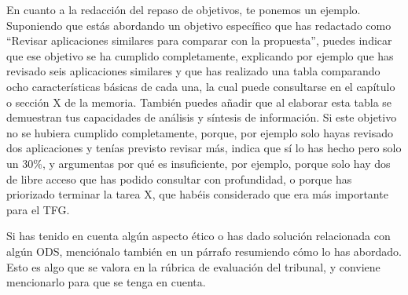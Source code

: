  En cuanto a la redacción del  repaso de objetivos, te ponemos un ejemplo. Suponiendo que estás abordando un objetivo específico que has redactado como ``Revisar aplicaciones similares para comparar con la propuesta'', puedes indicar que ese objetivo se ha cumplido completamente, explicando por ejemplo que has revisado seis aplicaciones similares y que has realizado una tabla comparando ocho características básicas de cada una, la cual puede consultarse en el capítulo o sección X de la memoria. También puedes añadir que al elaborar esta tabla se demuestran tus capacidades de análisis y síntesis de información. Si este objetivo no se hubiera cumplido completamente, porque, por ejemplo solo hayas revisado dos aplicaciones y tenías previsto revisar más, indica que sí lo has hecho pero solo un 30\%, y argumentas por qué es insuficiente, por ejemplo, porque solo hay dos de libre acceso que has podido consultar con profundidad, o porque has priorizado terminar la tarea X, que habéis considerado que era más importante para el TFG. 

 Si has tenido en cuenta algún aspecto ético o has dado solución relacionada con algún ODS, menciónalo también en un párrafo resumiendo cómo lo has abordado. Esto es algo que se valora en la rúbrica de evaluación del tribunal, y conviene mencionarlo para que se tenga en cuenta.

 
